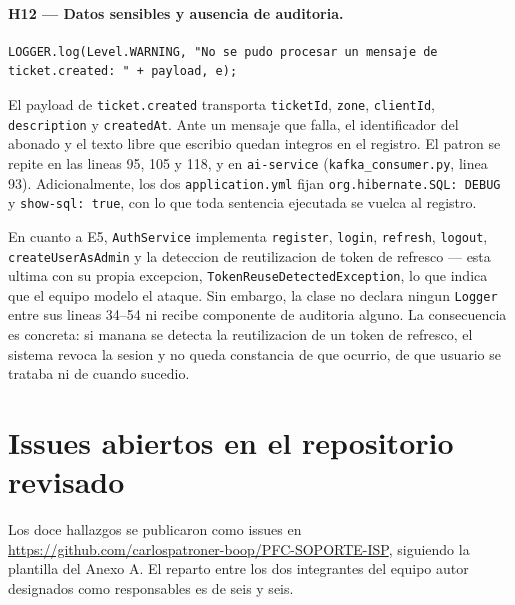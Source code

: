 \documentclass[10pt,a4paper]{article}
\newcommand{\repoRevisado}{https://github.com/carlospatroner-boop/PFC-SOPORTE-ISP}
\begin{document}
\paragraph{H12 --- Datos sensibles y ausencia de auditoria.}
\begin{lstlisting}[caption={\texttt{report-service/.../config/ReportEventListener.java}, linea 82},firstnumber=82]
LOGGER.log(Level.WARNING, "No se pudo procesar un mensaje de ticket.created: " + payload, e);
\end{lstlisting}

El payload de \texttt{ticket.created} transporta \texttt{ticketId}, \texttt{zone},
\texttt{clientId}, \texttt{description} y \texttt{createdAt}. Ante un mensaje que falla, el
identificador del abonado y el texto libre que escribio quedan integros en el registro. El
patron se repite en las lineas 95, 105 y 118, y en \texttt{ai-service}
(\texttt{kafka\_consumer.py}, linea 93). Adicionalmente, los dos \texttt{application.yml}
fijan \texttt{org.hibernate.SQL: DEBUG} y \texttt{show-sql: true}, con lo que toda sentencia
ejecutada se vuelca al registro.

En cuanto a E5, \texttt{AuthService} implementa \texttt{register}, \texttt{login},
\texttt{refresh}, \texttt{logout}, \texttt{createUserAsAdmin} y la deteccion de reutilizacion
de token de refresco --- esta ultima con su propia
excepcion, \texttt{TokenReuseDetected\-Exception}, lo que indica que el equipo modelo el ataque. Sin
embargo, la clase no declara ningun \texttt{Logger} entre sus lineas 34--54 ni recibe
componente de auditoria alguno. La consecuencia es concreta: si manana se detecta la
reutilizacion de un token de refresco, el sistema revoca la sesion y no queda constancia de
que ocurrio, de que usuario se trataba ni de cuando sucedio.

\section{Issues abiertos en el repositorio revisado}

Los doce hallazgos se publicaron como issues en \url{\repoRevisado}, siguiendo la plantilla
del Anexo A. El reparto entre los dos integrantes del equipo autor designados como
responsables es de seis y seis.
\end{document}
